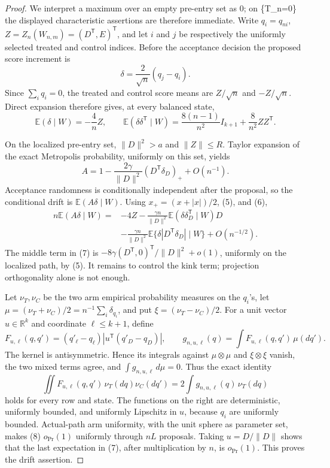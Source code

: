 \documentclass{article}
\begin{document}
\begin{proof}
We interpret a maximum over an empty pre-entry set as \(0\); on \{T\_n=0\} the displayed characteristic assertions are therefore immediate.  Write \(q_i=q_{ni}\), \(Z=Z_n(W_{n,m})=(D^{\mathsf T},E)^{\mathsf T}\), and let \(i\) and \(j\) be respectively the uniformly selected treated and control indices.  Before the acceptance decision the proposed score increment is
\[
 \delta=\frac2{\sqrt n}(q_j-q_i).
\]
Since \(\sum_iq_i=0\), the treated and control score means are \(Z/\sqrt n\) and \(-Z/\sqrt n\).  Direct expansion therefore gives, at every balanced state,
\[
 \mathbb E(\delta\mid W)=-\frac4nZ,
 \qquad
 \mathbb E(\delta\delta^{\mathsf T}\mid W)
 =\frac{8(n-1)}{n^2}I_{k+1}+\frac8{n^2}ZZ^{\mathsf T}. \tag{5}
\]

On the localized pre-entry set, \(\|D\|^2>a\) and \(\|Z\|\le R\).  Taylor expansion of the exact Metropolis probability, uniformly on this set, yields
\[
 A=1-\frac{2\gamma}{\|D\|^2}(D^{\mathsf T}\delta_D)_++O(n^{-1}). \tag{6}
\]
Acceptance randomness is conditionally independent after the proposal, so the conditional drift is \(\mathbb E(A\delta\mid W)\).  Using \(x_+=(x+|x|)/2\), (5), and (6),
\[
 \begin{split}
 n\mathbb E(A\delta\mid W)
 ={}&-4Z-\frac{\gamma n}{\|D\|^2}\mathbb E(\delta\delta_D^{\mathsf T}\mid W)D\\
 &-\frac{\gamma n}{\|D\|^2}\mathbb E\{\delta|D^{\mathsf T}\delta_D|\mid W\}+O(n^{-1/2}). \tag{7}
 \end{split}
\]
The middle term in (7) is \(-8\gamma(D^{\mathsf T},0)^{\mathsf T}/\|D\|^2+o(1)\), uniformly on the localized path, by (5).  It remains to control the kink term; projection orthogonality alone is not enough.

Let \(\nu_T,\nu_C\) be the two arm empirical probability measures on the \(q_i\)'s, let \(\mu=(\nu_T+\nu_C)/2=n^{-1}\sum_i\delta_{q_i}\), and put \(\xi=(\nu_T-\nu_C)/2\).  For a unit vector \(u\in\mathbb R^k\) and coordinate \(\ell\le k+1\), define
\[
 F_{u,\ell}(q,q')=(q'_\ell-q_\ell)|u^{\mathsf T}(q'_D-q_D)|,
 \qquad g_{n,u,\ell}(q)=\int F_{u,\ell}(q,q')\,\mu(dq').
\]
The kernel is antisymmetric.  Hence its integrals against \(\mu\otimes\mu\) and \(\xi\otimes\xi\) vanish, the two mixed terms agree, and \(\int g_{n,u,\ell}\,d\mu=0\).  Thus the exact identity
\[
 \iint F_{u,\ell}(q,q')\,\nu_T(dq)\nu_C(dq')
 =2\int g_{n,u,\ell}(q)\,\nu_T(dq) \tag{8}
\]
holds for every row and state.  The functions on the right are deterministic, uniformly bounded, and uniformly Lipschitz in \(u\), because \(q_i\) are uniformly bounded.  Actual-path arm uniformity, with the unit sphere as parameter set, makes (8) \(o_{\Pr}(1)\) uniformly through \(nL\) proposals.  Taking \(u=D/\|D\|\) shows that the last expectation in (7), after multiplication by \(n\), is \(o_{\Pr}(1)\).  This proves the drift assertion.


\end{proof}
\end{document}
